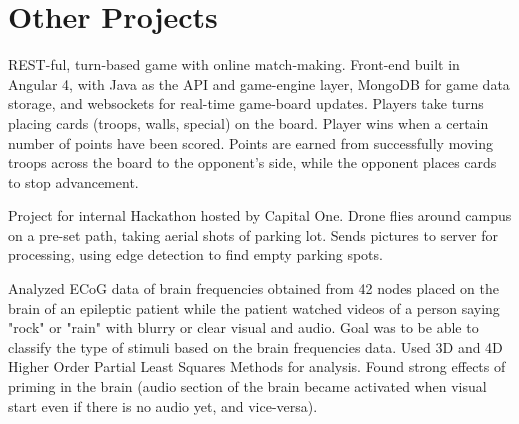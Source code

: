 \documentclass[letterpaper]{deedy-resume} %
\begin{document}
\begin{minipage}[t]{0.7\textwidth} %


\section{Other Projects}



REST-ful, turn-based game with online match-making. Front-end built in Angular 4, with Java as the API and game-engine layer, MongoDB for game data storage, and websockets for real-time game-board updates. Players take turns placing cards (troops, walls, special) on the board. Player wins when a certain number of points have been scored. Points are earned from successfully moving troops across the board to the opponent's side, while the opponent places cards to stop advancement. 

\sectionspace %


Project for internal Hackathon hosted by Capital One. Drone flies around campus on a pre-set path, taking aerial shots of parking lot. Sends pictures to server for processing, using edge detection to find empty parking spots. 

\sectionspace %



Analyzed ECoG data of brain frequencies obtained from 42 nodes placed on the brain of an epileptic patient while the patient watched videos of a person saying "rock" or "rain" with blurry or clear visual and audio. Goal was to be able to classify the type of stimuli based on the brain frequencies data. Used 3D and 4D Higher Order Partial Least Squares Methods for analysis. Found strong effects of priming in the brain (audio section of the brain became activated when visual start even if there is no audio yet, and vice-versa).


\end{minipage}
\end{document}

